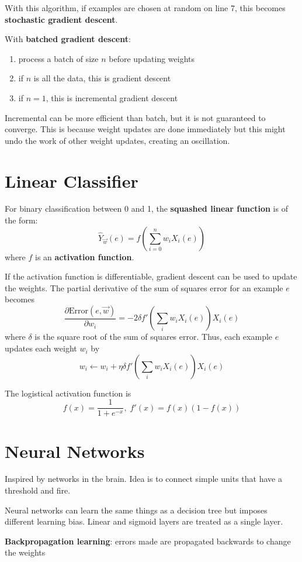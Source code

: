 \documentclass[11pt]{article}
\begin{document}
With this algorithm, if examples are chosen at random on line 7, this becomes
\textbf{stochastic gradient descent}.

With \textbf{batched gradient descent}:
\begin{enumerate}
\item process a batch of size \(n\) before updating weights
\item if \(n\) is all the data, this is gradient descent
\item if \(n=1\), this is incremental gradient descent
\end{enumerate}

Incremental can be more efficient than batch, but it is not guaranteed to
converge.
This is because weight updates are done immediately but this might undo the
work of other weight updates, creating an oscillation.
\section{Linear Classifier}
\label{sec:org414cccb}
For binary classification between 0 and 1, the \textbf{squashed linear function} is of the form:
$$ \hat{Y}_{\vec{w}}(e) = f \left( \sum_{i=0}^{n} w_{i}X_{i}(e) \right) $$
where \(f\) is an \textbf{activation function}.

If the activation function is differentiable, gradient descent can be used to update
the weights.
The partial derivative of the sum of squares error for an example \(e\) becomes
$$ \frac{\partial \text{Error}(e, \vec{w})}{\partial w_{i}} = -2 \delta f' \left( \sum_{i} w_{i} X_{i}(e) \right) X_{i}(e) $$
where \(\delta\) is the square root of the sum of squares error.
Thus, each example \(e\) updates each weight \(w_{i}\) by
$$ w_{i} \gets w_{i} + \eta \delta f' \left( \sum_{i} w_{i}X_{i}(e) \right) X_{i}(e) $$

The logistical activation function is
$$ f(x) = \frac{1}{1 + e^{-x}}, \; f'(x) = f(x)(1 - f(x)) $$
\section{Neural Networks}
\label{sec:org8266110}
Inspired by networks in the brain.
Idea is to connect simple units that have a threshold and fire.

Neural networks can learn the same things as a decision tree but imposes
different learning bias.
Linear and sigmoid layers are treated as a single layer.

\textbf{Backpropagation learning}: errors made are propagated backwards to change the weights
\end{document}
